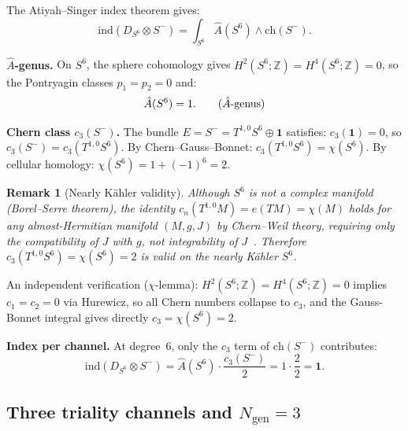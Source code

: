 \documentclass[12pt,a4paper]{article}
\newcommand{\ind}{\mathrm{ind}}
\newcommand{\ZZ}{\mathbb{Z}}
\newtheorem{remark}[lemma]{Remark}
\begin{document}
The Atiyah--Singer index theorem gives:
\begin{equation}
  \ind(D_{S^6}\otimes S^-) = \int_{S^6} \hat{A}(S^6)\wedge\mathrm{ch}(S^-).
\end{equation}

\textbf{$\hat{A}$-genus.} On $S^6$, the sphere cohomology gives $H^2(S^6;\ZZ)=H^4(S^6;\ZZ)=0$,
so the Pontryagin classes $p_1=p_2=0$ and:
\begin{equation}
  \hat{A}(S^6) = 1. \tag{$\hat{A}$-genus}
\end{equation}

\textbf{Chern class $c_3(S^-)$.} The bundle $E=S^-=T^{1,0}S^6\oplus\mathbf{1}$ satisfies:
$c_3(\mathbf{1})=0$, so $c_3(S^-)=c_3(T^{1,0}S^6)$. By Chern--Gauss--Bonnet:
$c_3(T^{1,0}S^6)=\chi(S^6)$. By cellular homology: $\chi(S^6)=1+(-1)^6=2$.

\begin{remark}[Nearly K\"ahler validity]
Although $S^6$ is not a complex manifold (Borel--Serre theorem), the identity
$c_n(T^{1,0}M)=e(TM)=\chi(M)$ holds for \emph{any} almost-Hermitian manifold $(M,g,J)$
by Chern--Weil theory, requiring only the compatibility of $J$ with $g$, not
integrability of $J$~\cite{KN1969}. Therefore
$c_3(T^{1,0}S^6)=\chi(S^6)=2$ is valid on the nearly K\"ahler $S^6$.
\end{remark}

An independent verification ($\chi$-lemma): $H^2(S^6;\ZZ)=H^4(S^6;\ZZ)=0$ implies
$c_1=c_2=0$ via Hurewicz, so all Chern numbers collapse to $c_3$, and the Gauss-Bonnet
integral gives directly $c_3=\chi(S^6)=2$.

\textbf{Index per channel.} At degree~6, only the $c_3$ term of $\mathrm{ch}(S^-)$
contributes:
\begin{equation}
  \ind(D_{S^6}\otimes S^-) = \hat{A}(S^6)\cdot\frac{c_3(S^-)}{2}
  = 1\cdot\frac{2}{2} = \mathbf{1}.
  \tag{Lemma L2}
\end{equation}

\subsection{Three triality channels and \texorpdfstring{$N_{\mathrm{gen}}=3$}{Ngen=3}}
\label{sec:three-channels}
\end{document}
